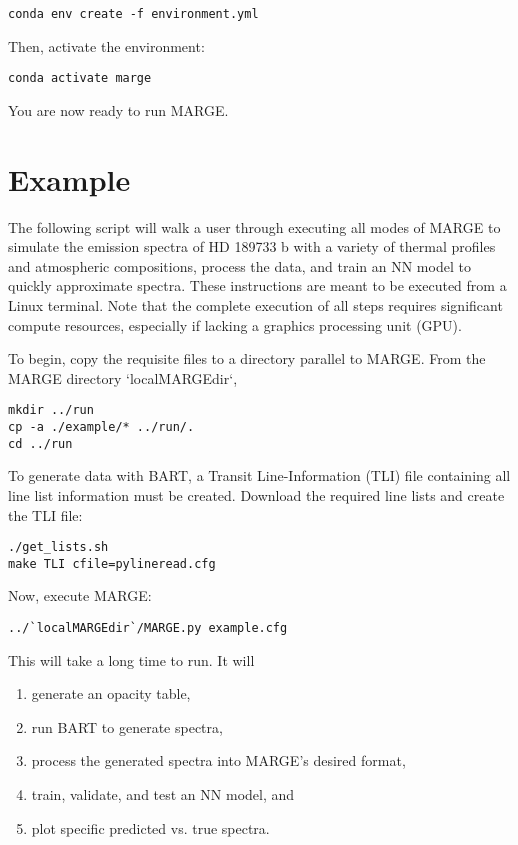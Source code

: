 \documentclass[letterpaper, 12pt]{article}
\begin{document}
\begin{verbatim}
conda env create -f environment.yml
\end{verbatim}

\noindent Then, activate the environment:

\begin{verbatim}
conda activate marge
\end{verbatim}

\noindent You are now ready to run MARGE.


\section{Example}
\label{sec:example}

\noindent The following script will walk a user through executing all modes of MARGE 
to simulate the emission spectra of HD 189733 b with a variety of thermal 
profiles and atmospheric compositions, process the data, and train an NN 
model to quickly approximate spectra.  These instructions are meant to be 
executed from a Linux terminal.  Note that the complete execution of all steps 
requires significant compute resources, especially if lacking a graphics 
processing unit (GPU).

\noindent To begin, copy the requisite files to a directory parallel to MARGE.  From 
the MARGE directory `localMARGEdir`,

\begin{verbatim}
mkdir ../run
cp -a ./example/* ../run/.
cd ../run
\end{verbatim}

\noindent To generate data with BART, a Transit Line-Information (TLI) file containing 
all line list information must be created.  Download the required line lists 
and create the TLI file:

\begin{verbatim}
./get_lists.sh
make TLI cfile=pylineread.cfg
\end{verbatim}

\noindent Now, execute MARGE:

\begin{verbatim}
../`localMARGEdir`/MARGE.py example.cfg
\end{verbatim}

\noindent This will take a long time to run.  It will 

\begin{enumerate}
\item generate an opacity table,
\item run BART to generate spectra,
\item process the generated spectra into MARGE's desired format,
\item train, validate, and test an NN model, and
\item plot specific predicted vs. true spectra.
\end{enumerate}
\end{document}
